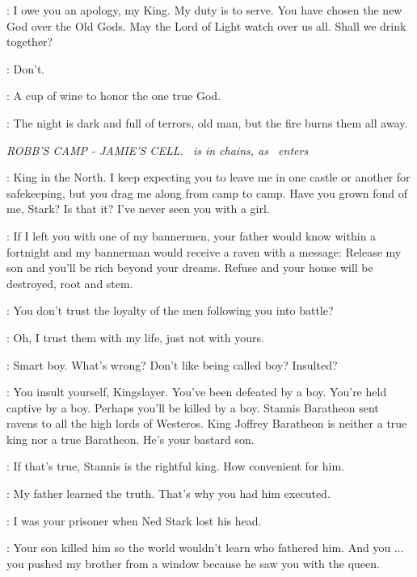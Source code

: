 \CRESSEN:  I owe you an apology, my King. My duty is to serve. You have chosen the new God over the Old Gods. May the Lord of Light watch over us all.  Shall we drink together?

\DAVOS: Don't.

\CRESSEN: A cup of wine to honor the one true God.


\MELISANDRE: The night is dark and full of terrors, old man, but the fire burns them all away.


\scene

\textit{ROBB'S CAMP - JAMIE'S CELL.  \JAIME ~is in chains, as \ROBB ~enters}

\JAIME: King in the North. I keep expecting you to leave me in one castle or another for safekeeping, but you drag me along from camp to camp. Have you grown fond of me, Stark? Is that it? I've never seen you with a girl.

\ROBB: If I left you with one of my bannermen, your father would know within a fortnight and my bannerman would receive a raven with a message: Release my son and you'll be rich beyond your dreams. Refuse and your house will be destroyed, root and stem.

\JAIME: You don't trust the loyalty of the men following you into battle?

\ROBB: Oh, I trust them with my life, just not with yours.

\JAIME: Smart boy. What's wrong? Don't like being called boy? Insulted?

\ROBB: You insult yourself, Kingslayer. You've been defeated by a boy. You're held captive by a boy. Perhaps you'll be killed by a boy. Stannis Baratheon sent ravens to all the high lords of Westeros. King Joffrey Baratheon is neither a true king nor a true Baratheon. He's your bastard son.

\JAIME: If that's true, Stannis is the rightful king. How convenient for him.

\ROBB: My father learned the truth. That's why you had him executed.

\JAIME: I was your prisoner when Ned Stark lost his head.

\ROBB: Your son killed him so the world wouldn't learn who fathered him. And you $\ldots$ you pushed my brother from a window because he saw you with the queen.

